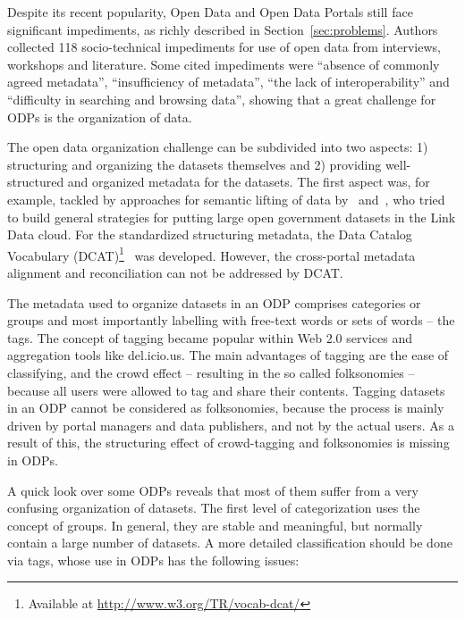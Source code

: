 Despite its recent popularity, Open Data and Open Data Portals still face significant impediments, as richly described in Section~\ref{sec:problems}.
Authors collected 118 socio-technical impediments for use of open data from interviews, workshops and literature.
Some cited impediments were ``absence of commonly agreed metadata'', ``insufficiency of metadata'', ``the lack of interoperability'' and ``difficulty in searching and browsing data'', showing that a great challenge for ODPs is the organization of data.

The open data organization challenge can be subdivided into two aspects: 1) structuring and organizing the datasets themselves and 2) providing well-structured and organized metadata for the datasets.
The first aspect was, for example, tackled by approaches for semantic lifting of data by~\cite{DBLP:conf/i-semantics/ErmilovAS13} and~\cite{Ding2011325}, who tried to build general strategies for putting large open government datasets in the Link Data cloud.
For the standardized structuring metadata, the Data Catalog Vocabulary (DCAT)\footnote{Available at \url{http://www.w3.org/TR/vocab-dcat/}}~\cite{conf/i-semantics/CyganiakMP10} was developed.
However, the cross-portal metadata alignment and reconciliation can not be addressed by DCAT.

The metadata used to organize datasets in an ODP comprises categories or groups and most importantly labelling with free-text words or sets of words -- the tags.
The concept of tagging became popular within Web 2.0 services and aggregation tools like del.icio.us. 
The main advantages of tagging are the ease of classifying, and the crowd effect -- resulting in the so called folksonomies -- because all users were allowed to tag and share their contents. 
Tagging datasets in an ODP cannot be considered as folksonomies, because the process is mainly driven by portal managers and data publishers, and not by the actual users.
As a result of this, the structuring effect of crowd-tagging and folksonomies is missing in ODPs.

A quick look over some ODPs reveals that most of them suffer from a very confusing organization of datasets. 
The first level of categorization uses the concept of groups.
In general, they are stable and meaningful, but normally contain a large number of datasets.
A more detailed classification should be done via tags, whose use in ODPs has the following issues:

